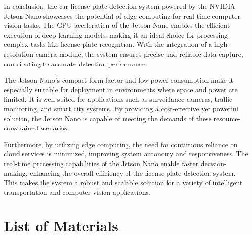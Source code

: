 In conclusion, the car license plate detection system powered by the NVIDIA Jetson Nano showcases the potential of edge computing for real-time computer vision tasks. The GPU acceleration of the Jetson Nano enables the efficient execution of deep learning models, making it an ideal choice for processing complex tasks like license plate recognition. With the integration of a high-resolution camera module, the system ensures precise and reliable data capture, contributing to accurate detection performance.

The Jetson Nano's compact form factor and low power consumption make it especially suitable for deployment in environments where space and power are limited. It is well-suited for applications such as surveillance cameras, traffic monitoring, and smart city systems. By providing a cost-effective yet powerful solution, the Jetson Nano is capable of meeting the demands of these resource-constrained scenarios.

Furthermore, by utilizing edge computing, the need for continuous reliance on cloud services is minimized, improving system autonomy and responsiveness. The real-time processing capabilities of the Jetson Nano enable faster decision-making, enhancing the overall efficiency of the license plate detection system. This makes the system a robust and scalable solution for a variety of intelligent transportation and computer vision applications.

\chapter{List of Materials}

